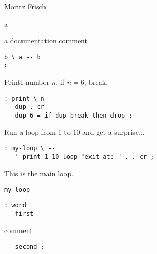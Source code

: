 \documentclass{article}
\begin{document}
 
Moritz Frisch
 
a
 
a documentation comment
 
\begin{verbatim}
b \ a -- b
c
\end{verbatim}
Printt number $n$, if $n = 6$, break.
\begin{verbatim}
: print \ n --
   dup . cr 
   dup 6 = if dup break then drop ;
\end{verbatim}
Run a loop from $1$ to $10$ and get a surprise$\dots$
\begin{verbatim}
: my-loop \ --
   ' print 1 10 loop "exit at: " . . cr ;
\end{verbatim}
This is the main loop.
\begin{verbatim}
my-loop
\end{verbatim}
\begin{verbatim}
: word
   first
\end{verbatim}
comment
\begin{verbatim}
   second ;
\end{verbatim}
\end{document}
